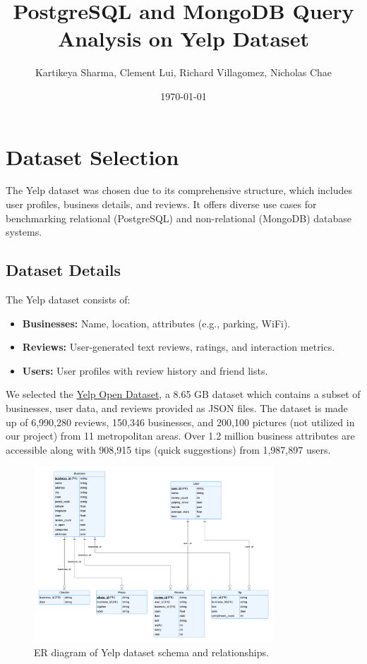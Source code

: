 \documentclass[12pt]{article}
\title{PostgreSQL and MongoDB Query Analysis on Yelp Dataset}
\author{Kartikeya Sharma, Clement Lui, Richard Villagomez, Nicholas Chae}
\date{\today}
\begin{document}
\maketitle

\section{Dataset Selection}
The Yelp dataset was chosen due to its comprehensive structure, which includes user profiles, business details, and reviews. It offers diverse use cases for benchmarking relational (PostgreSQL) and non-relational (MongoDB) database systems.

\subsection{Dataset Details}
The Yelp dataset consists of:
\begin{itemize}
    \item \textbf{Businesses:} Name, location, attributes (e.g., parking, WiFi).
    \item \textbf{Reviews:} User-generated text reviews, ratings, and interaction metrics.
    \item \textbf{Users:} User profiles with review history and friend lists.
\end{itemize}


We selected the \href{https://www.yelp.com/dataset}{Yelp Open Dataset}, a 8.65 GB dataset which contains a subset of businesses, user data, and reviews provided as JSON files. The dataset is made up of 6,990,280 reviews, 150,346 businesses, and 200,100 pictures (not utilized in our project) from 11 metropolitan areas. Over 1.2 million business attributes are accessible along with 908,915 tips (quick suggestions) from 1,987,897 users.

\begin{figure}[h!]
    \centering
    \includegraphics[width=0.8\textwidth]{er-diagram.png} %
    \caption{ER diagram of Yelp dataset schema and relationships.}
    \label{fig:example} %
\end{figure}
\end{document}
